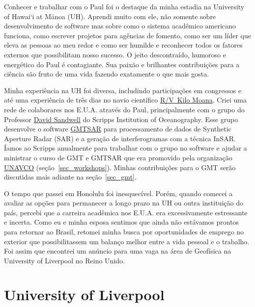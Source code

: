 \documentclass[10pt,a4paper,oneside]{book}
\newcommand{\UHM}{University of Hawai`i at M\={a}noa}
\begin{document}
Conhecer e trabalhar com o Paul foi o destaque da minha estadia na
\UHM{} (UH).
Aprendi muito com ele, não somente sobre desenvolvimento de software mas sobre
como o sistema acadêmico americano funciona, como escrever projetos para
agências de fomento, como ser um líder que eleva as pessoas ao meu redor e como
ser humilde e reconhecer todos os fatores externos que possibilitam nosso
sucesso.
O jeito descontraído, humoroso e energético do Paul é contagiante.
Sua paixão e brilhantes contribuições para a ciência são fruto de uma vida
fazendo exatamente o que mais gosta.

Minha experiência na UH foi diversa, includindo participações em congressos e
até uma experiência de três dias no navio científico
\href{https://www.soest.hawaii.edu/soestwp/tech/watercraft/kilo-moana/}{R/V Kilo Moana}.
Criei uma rede de colaborares nos E.U.A. através do Paul, principalmente com
o grupo do Professor \href{https://topex.ucsd.edu/sandwell/}{David Sandwell}
do Scripps Institution of Oceanography.
Esse grupo desenvolve o software \href{https://github.com/gmtsar}{GMTSAR} para
processamento de dados de Synthetic Aperture Radar (SAR) e a geração de
interferogramas com a técnica InSAR.
Íamos ao Scripps anualmente para trabalhar com o grupo no software e ajudar a
ministrar o curso de GMT e GMTSAR que era promovido pela organização
\href{https://www.unavco.org/}{UNAVCO} (seção~\ref{sec_workshops}).
Minhas contribuições para o GMT serão discutidas mais adiante na
seção~\ref{sec_gmt}.

O tempo que passei em Honolulu foi inesquecível.
Porém, quando comecei a avaliar as opções para permanecer a longo prazo na UH
ou outra instituição do país, percebi que a carreira acadêmica nos E.U.A. era
excessivamente estressante e incerta.
Como eu e minha esposa sentimos que ainda não estávamos prontos para retornar
ao Brasil, retomei minha busca por oportunidades de emprego no exterior que
possibilitassem um balanço melhor entre a vida pessoal e o trabalho.
Foi assim que encontrei um anúncio para uma vaga na área de Geofísica na
University of Liverpool no Reino Unido.


\section{University of Liverpool}
\end{document}
